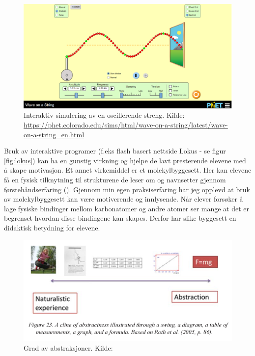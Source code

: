 \documentclass[main.tex]{subfiles}
\begin{document}
\begin{figure}[h!]
\centering
\includegraphics[scale = 0.25]{../figures/wave.png}
\caption{Interaktiv simulering av en oscillerende streng. Kilde: 
\protect\url{https://phet.colorado.edu/sims/html/wave-on-a-string/latest/wave-on-a-string_en.html}}
\label{fig:wave}
\end{figure}

\hspace{-6mm}Bruk av interaktive programer (f.eks flash basert nettside Lokus - se figur \ref{fig:lokus}) kan ha en gunstig virkning og hjelpe de lavt presterende elevene med å skape motivasjon. Et annet virkemiddel er et molekylbyggesett. Her kan elevene få en fysisk tilknytning til strukturene de leser om og navnsetter gjennom førstehåndserfaring (). Gjennom min egen praksiserfaring har jeg opplevd at bruk av molekylbyggesett kan være motiverende og innlysende. Når elever forsøker å lage fysiske bindinger mellom karbonatomer og andre atomer ser mange at det er begrenset hvordan disse bindingene kan skapes. Derfor har slike byggesett en didaktisk betydning for elevene. \newline

\begin{figure}[h!]
\centering
\includegraphics[scale = 0.6]{../figures/knain.png}
\caption{Grad av abstraksjoner. Kilde: \protect{}}
\label{fig:knain}
\end{figure}
\end{document}
